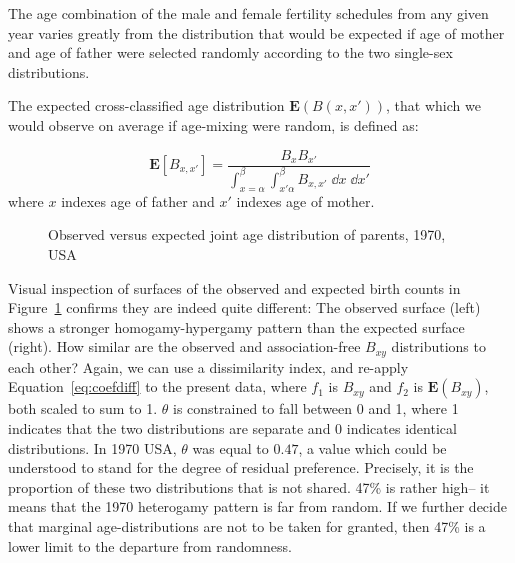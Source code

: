  \FloatBarrier
The age combination of the male and female fertility schedules from
any given year varies greatly from the distribution that would be expected if
age of mother and age of father were selected randomly according to the two
single-sex distributions.

The expected cross-classified age distribution $\textbf{E}(B(x,x'))$, that which
we would observe on average if age-mixing were random, is defined as:

\begin{equation}
\label{eq:expected}
\textbf{E}\left[B_{x,x'}\right] = \frac{B_x B_{x'}}{\int _{x = \alpha} ^\beta
\int _{x' \alpha} ^\beta B_{x,x'} \; \dd x \;\dd x'}
\end{equation}
where $x$ indexes age of father and $x'$ indexes age of mother.

\begin{figure}[ht!]
        \centering  
          \caption{Observed versus expected joint age distribution of
          parents, 1970, USA}
          \label{fig:US1970obsexp}
\end{figure}

Visual inspection of surfaces of the observed and expected birth counts in
Figure~\ref{fig:US1970obsexp} confirms they are indeed quite different: The
observed surface (left) shows a stronger homogamy-hypergamy pattern than the
expected surface (right). How similar are the
observed and association-free $B_{xy}$ distributions to each other? Again, we
can use a dissimilarity index, and re-apply Equation~\ref{eq:coefdiff} to the
present data, where $f_1$ is $B_{xy}$ and $f_2$ is $\textbf{E}(B_{xy})$, both scaled 
to sum to 1. $\theta$ is constrained to fall between 0 and 1, where 1 indicates that the
two distributions are separate and 0 indicates identical distributions. In 1970 USA,
$\theta$ was equal to $0.47$, a value which could be understood to stand for the
degree of residual preference. Precisely, it is the proportion of these two
distributions that is not shared. 47\% is rather high-- it means that the 1970
heterogamy pattern is far from random. If we further decide that marginal
age-distributions are not to be taken for granted, then 47\% is a lower limit to
the departure from randomness.

